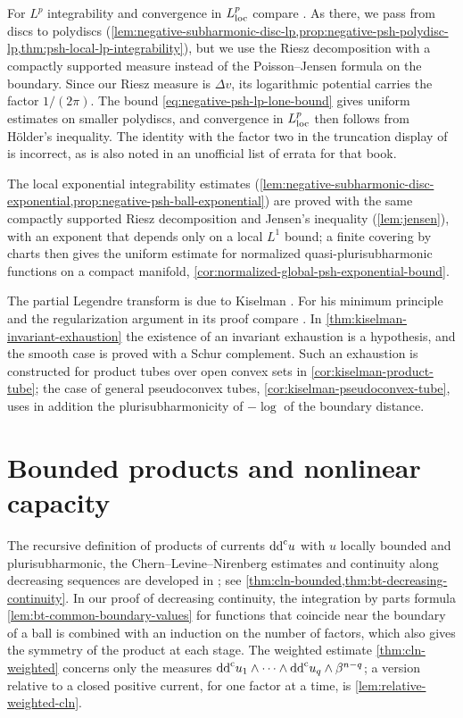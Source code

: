 For $L^p$ integrability and convergence in $L^p_{\mathrm{loc}}$ compare \cite[Theorem 1.48, parts 1--2 and proof Steps 1--2]{GZ17}. As there, we pass from discs to polydiscs (\cref{lem:negative-subharmonic-disc-lp,prop:negative-psh-polydisc-lp,thm:psh-local-lp-integrability}), but we use the Riesz decomposition with a compactly supported measure instead of the Poisson--Jensen formula on the boundary. Since our Riesz measure is $\Delta v$, its logarithmic potential carries the factor $1/(2\pi)$. The bound \eqref{eq:negative-psh-lp-lone-bound} gives uniform estimates on smaller polydiscs, and convergence in $L^p_{\mathrm{loc}}$ then follows from H\"older's inequality. The identity with the factor two in the truncation display of \cite[proof of Theorem 1.48, Step 2, truncation display]{GZ17} is incorrect, as is also noted in an unofficial list of errata for that book.

The local exponential integrability estimates (\cref{lem:negative-subharmonic-disc-exponential,prop:negative-psh-ball-exponential}) are proved with the same compactly supported Riesz decomposition and Jensen's inequality (\cref{lem:jensen}), with an exponent that depends only on a local $L^1$ bound; a finite covering by charts then gives the uniform estimate for normalized quasi-plurisubharmonic functions on a compact manifold, \cref{cor:normalized-global-psh-exponential-bound}.

The partial Legendre transform is due to Kiselman \cite{Kis78}. For his minimum principle and the regularization argument in its proof compare \cite[Chapter I, Section 7.B, Theorem (7.5) and its proof]{DemBook}. In \cref{thm:kiselman-invariant-exhaustion} the existence of an invariant exhaustion is a hypothesis, and the smooth case is proved with a Schur complement. Such an exhaustion is constructed for product tubes over open convex sets in \cref{cor:kiselman-product-tube}; the case of general pseudoconvex tubes, \cref{cor:kiselman-pseudoconvex-tube}, uses in addition the plurisubharmonicity of $-\log$ of the boundary distance.

\section{Bounded products and nonlinear capacity}
\label{sec:history-bounded-products}
The recursive definition of products of currents $\mathrm{dd}^{\mathrm{c}} u$ with $u$ locally bounded and plurisubharmonic, the Chern--Levine--Nirenberg estimates and continuity along decreasing sequences are developed in \cite[Chapter III, Section 3, (3.1)--(3.11)]{DemBook}; see \cref{thm:cln-bounded,thm:bt-decreasing-continuity}. In our proof of decreasing continuity, the integration by parts formula \cref{lem:bt-common-boundary-values} for functions that coincide near the boundary of a ball is combined with an induction on the number of factors, which also gives the symmetry of the product at each stage. The weighted estimate \cref{thm:cln-weighted} concerns only the measures $\mathrm{dd}^{\mathrm{c}} u_1\wedge\cdots\wedge\mathrm{dd}^{\mathrm{c}} u_q\wedge\beta^{n-q}$; a version relative to a closed positive current, for one factor at a time, is \cref{lem:relative-weighted-cln}.


